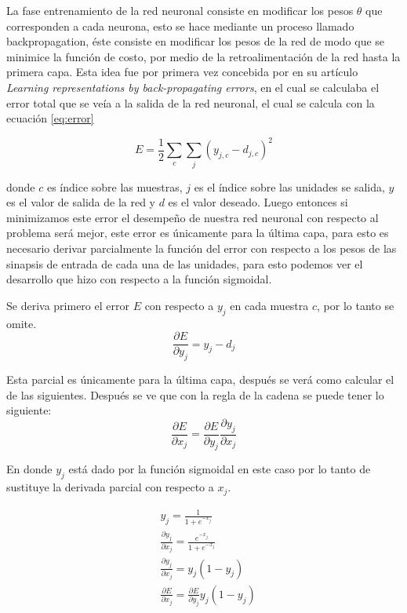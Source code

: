 \par La fase entrenamiento de la red neuronal consiste en modificar los pesos $\theta$ que corresponden a cada neurona, esto se hace mediante un proceso llamado \gls{backpropagation}, éste consiste en modificar los pesos de la red de modo que se minimice la función de costo, por medio de la retroalimentación de la red hasta la primera capa. Esta idea fue por primera vez concebida por \cite{rumelhart1986learning} en su artículo \textit{Learning representations by back-propagating errors}, en el cual se calculaba el error total que se veía a la salida de la red neuronal, el cual se calcula con la ecuación \ref{eq:error}
			
\begin{equation}\label{eq:error}
	E=\frac{1}{2}\sum _{c}\sum _{j}( y_{j,c} -d_{j,c})^{2}
\end{equation}
			
donde $c$ es índice sobre las muestras, $j$ es el índice sobre las unidades se salida, $y$ es el valor de salida de la red y $d$ es el valor deseado. Luego entonces si minimizamos este error el desempeño de nuestra red neuronal con respecto al problema será mejor, este error es únicamente para la última capa, para esto es necesario derivar parcialmente la función del error con respecto a los pesos de las sinapsis de entrada de cada una de las unidades, para esto podemos ver el desarrollo que hizo \cite{rumelhart1986learning} con respecto a la función sigmoidal.
			
\par Se deriva primero el error $E$ con respecto a $y_{j}$ en cada muestra $c$, por lo tanto se omite.
\begin{equation}
	\frac{\partial E}{\partial y_{j}} =y_{j} -d_{j}
\end{equation}
\par Esta parcial es únicamente para la última capa, después se verá como calcular el de las siguientes. Después se ve que con la regla de la cadena se puede tener lo siguiente:
\begin{equation}
	\frac{\partial E}{\partial x_{j}} =\frac{\partial E}{\partial y_{j}}  \frac{\partial y_{j}}{\partial x_{j}}
\end{equation}
			
En donde $y_{j}$ está dado por la función sigmoidal en este caso por lo tanto de sustituye la derivada parcial con respecto a $x_{j}$.
\begin{spreadlines}{10pt}
	\begin{alignat}{4}
		  & y_{j} =\frac{1}{1+e^{-x_{j}}}                                                         \\
		  & \frac{\partial y_{j}}{\partial x_{j}} =\frac{e^{-x_{j}}}{1+e^{-x_{j}}}                \\
		  & \frac{\partial y_{j}}{\partial x_{j}}=y_{j} (1-y_{j})                                 \\
		  & \frac{\partial E}{\partial x_{j}} =\frac{\partial E}{\partial y_{j}}  y_{j}( 1-y_{j}) 
	\end{alignat}
\end{spreadlines}
			
